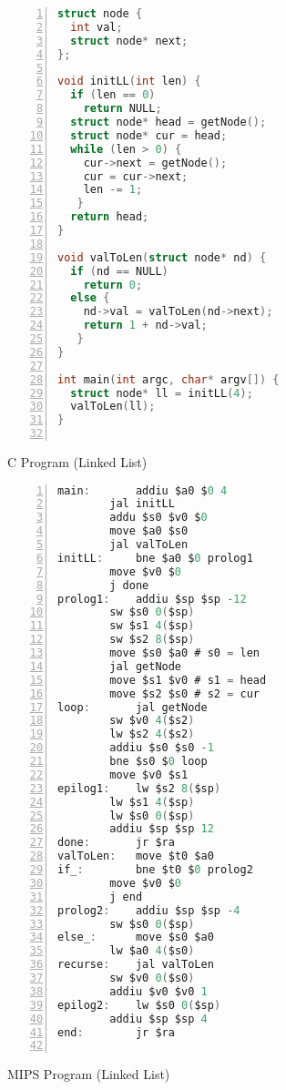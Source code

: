 \documentclass{article}
\begin{document}
\begin{figure}
\centering
\begin{minipage}{0.45\textwidth}
\renewcommand{\ttdefault}{pcr}
\begin{lstlisting}[language=C, basicstyle=\ttfamily, numbers=left, stepnumber=1, firstnumber=1, numberfirstline=true]
struct node {
  int val;
  struct node* next;
};

void initLL(int len) {
  if (len == 0)
    return NULL;
  struct node* head = getNode();
  struct node* cur = head;
  while (len > 0) {
    cur->next = getNode();
    cur = cur->next;
    len -= 1;
   }
  return head;
}

void valToLen(struct node* nd) {
  if (nd == NULL)
    return 0;
  else {
    nd->val = valToLen(nd->next);
    return 1 + nd->val;
   }
}

int main(int argc, char* argv[]) {
  struct node* ll = initLL(4);
  valToLen(ll);
}
  
\end{lstlisting}
\caption{C Program (Linked List)}
\vfill
\end{minipage}\hfill
%
\begin{minipage}{0.45\textwidth}
\raggedright
\renewcommand{\ttdefault}{pcr}
\begin{lstlisting}[language=C, basicstyle=\ttfamily, keywordstyle=\bfseries, showstringspaces=false, morekeywords={jal, addu, move, bne, j, sw, addiu, lw, jr}, numbers=left, stepnumber=1, firstnumber=1, numberfirstline=true, numberstyle=\small]
main:		addiu $a0 $0 4
		jal initLL
		addu $s0 $v0 $0
		move $a0 $s0
		jal valToLen
initLL: 	bne $a0 $0 prolog1
		move $v0 $0
		j done
prolog1:  	addiu $sp $sp -12
		sw $s0 0($sp)
		sw $s1 4($sp)
		sw $s2 8($sp)
		move $s0 $a0 # s0 = len
		jal getNode
		move $s1 $v0 # s1 = head
		move $s2 $s0 # s2 = cur	
loop:		jal getNode
		sw $v0 4($s2)
		lw $s2 4($s2)
		addiu $s0 $s0 -1
		bne $s0 $0 loop
		move $v0 $s1
epilog1:	lw $s2 8($sp)
		lw $s1 4($sp)
		lw $s0 0($sp)
		addiu $sp $sp 12
done:		jr $ra 
valToLen:	move $t0 $a0
if_:		bne $t0 $0 prolog2
		move $v0 $0
		j end
prolog2:	addiu $sp $sp -4
		sw $s0 0($sp)
else_:		move $s0 $a0
		lw $a0 4($s0)
recurse:	jal valToLen
		sw $v0 0($s0)
		addiu $v0 $v0 1
epilog2:	lw $s0 0($sp)
		addiu $sp $sp 4
end:		jr $ra
		
\end{lstlisting}
\caption{MIPS Program (Linked List)}
\end{minipage}
%
\end{figure}
\end{document}
